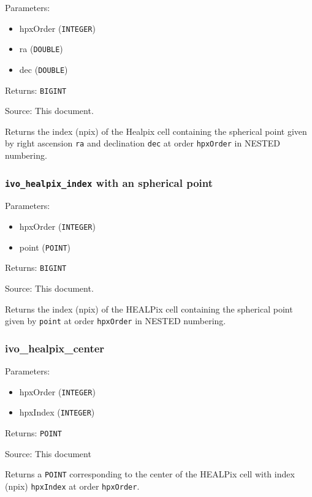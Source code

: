 \documentclass[11pt,a4paper]{ivoa}
\begin{document}
Parameters:

\begin{itemize}
	\item hpxOrder (\texttt{INTEGER})
	\item ra (\texttt{DOUBLE})
	\item dec (\texttt{DOUBLE})
\end{itemize}

Returns: \texttt{BIGINT}

Source: This document.

Returns the index (npix) of the Healpix cell containing the spherical
point given by right ascension \texttt{ra} and declination \texttt{dec}
at order \texttt{hpxOrder} in NESTED numbering.

\subsubsection{\texttt{ivo\_healpix\_index} with an spherical point}

Parameters:

\begin{itemize}
	\item hpxOrder (\texttt{INTEGER})
	\item point (\texttt{POINT})
\end{itemize}

Returns: \texttt{BIGINT}

Source: This document.

Returns the index (npix) of the HEALPix cell containing the spherical
point given by \texttt{point} at order \texttt{hpxOrder} in NESTED
numbering.


\subsubsection{ivo\_healpix\_center}

Parameters:

\begin{itemize}
	\item hpxOrder (\texttt{INTEGER})
	\item hpxIndex (\texttt{INTEGER})
\end{itemize}

Returns: \texttt{POINT}

Source: This document

Returns a \texttt{POINT} corresponding to the center of the HEALPix cell
with index (npix) \texttt{hpxIndex} at order \texttt{hpxOrder}.
\end{document}

